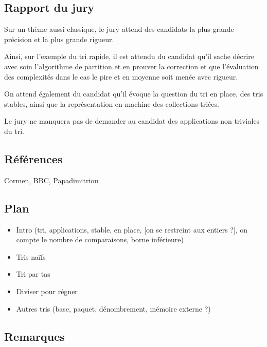 \documentclass[../../Agregation.tex]{subfiles}
\begin{document}

\subsection{Rapport du jury}

\begin{aquote}{}
Sur un thème aussi classique, le jury attend des candidats la plus grande précision et la plus grande rigueur.

Ainsi, sur l'exemple du tri rapide, il est attendu du candidat qu'il sache décrire avec soin l'algorithme de partition et en prouver la correction et que l'évaluation des complexités dans le cas le pire et en moyenne soit menée avec rigueur.

On attend également du candidat qu'il évoque la question du tri en place, des tris stables, ainsi que la représentation en machine des collections triées.

Le jury ne manquera pas de demander au candidat des applications non triviales du tri.
\end{aquote}

\dvts

\subsection{Références}

Cormen, BBC, Papadimitriou

\subsection{Plan}

\begin{itemize}
	\item Intro (tri, applications, stable, en place, [on se restreint aux entiers ?], on compte le nombre de comparaisons, borne inférieure)
	\item Tris naïfs
	\item Tri par tas
	\item Diviser pour régner
	\item Autres tris (base, paquet, dénombrement, mémoire externe ?)
\end{itemize}

\subsection{Remarques}
\end{document}
